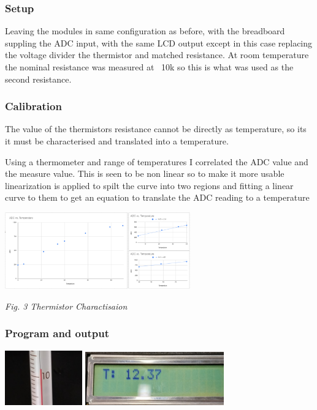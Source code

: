 \documentclass[11pt]{article}
\begin{document}
\begin{preview}
        \subsubsection*{Setup}
        Leaving the modules in same configuration as before, with the breadboard suppling the ADC input, with the same LCD output except in this case replacing the voltage divider the thermistor and matched resistance. At room temperature the nominal resistance was measured at ~10k so this is what was used as the second resistance.

        \subsubsection*{Calibration}
        The value of the thermistors resistance cannot be directly as temperature, so its it must be characterised and translated into a temperature. 

        Using a thermometer and range of temperatures I correlated the ADC value and the measure value. This is seen to be non linear so to make it more usable linearization is applied to spilt the curve into two regions and fitting a linear curve to them to get an equation to translate the ADC reading to a temperature

        \begin{center}
                \includegraphics[width=0.6\textwidth]{res/tempFIT.png}

                \textit{Fig. 3 Thermistor Charactisaion}
        \end{center}
        
        
        \subsubsection*{Program and output}
        \begin{center}
                \includegraphics[width=0.25\textwidth]{res/temp0.jpg}
                \includegraphics[width=0.45\textwidth]{res/tempADC0.jpg}


\end{center}
\end{preview}
\end{document}
